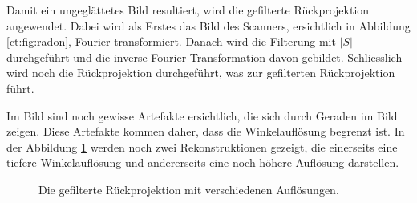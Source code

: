 Damit ein ungeglättetes Bild resultiert, wird die gefilterte Rückprojektion angewendet. Dabei wird als Erstes das Bild des Scanners, ersichtlich in Abbildung \ref{ct:fig:radon}, Fourier-transformiert. Danach wird die Filterung mit $|S|$ durchgeführt und die inverse Fourier-Transformation davon gebildet. Schliesslich wird noch die Rückprojektion durchgeführt, was zur gefilterten Rückprojektion führt. 

Im Bild sind noch gewisse Artefakte ersichtlich, die sich durch Geraden im Bild zeigen. Diese Artefakte kommen daher, dass die Winkelauflösung begrenzt ist. In der Abbildung \ref{ct:fig:res} werden noch zwei Rekonstruktionen gezeigt, die einerseits eine tiefere Winkelauflösung und andererseits eine noch höhere Auflösung darstellen.
%
%

\begin{figure}
	\centering
	\caption{Die gefilterte Rückprojektion mit verschiedenen Auflösungen.}
	\label{ct:fig:res}
\end{figure}










